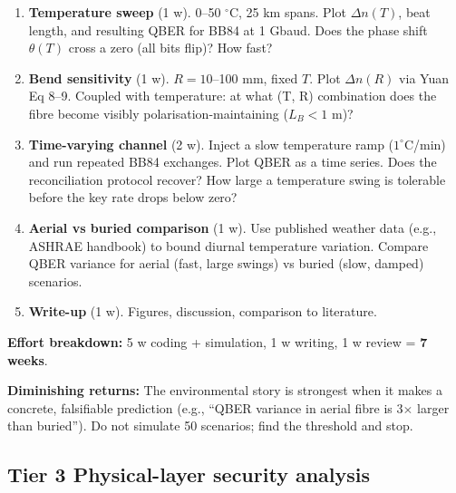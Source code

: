 \documentclass[11pt,a4paper]{article}
\begin{document}
\begin{enumerate}[nosep]
    \item \textbf{Temperature sweep} (1 w).  0--50 $^\circ$C, 25 km spans.  Plot $\Delta n(T)$,
          beat length, and resulting QBER for BB84 at 1 Gbaud.  Does the phase shift $\theta(T)$
          cross a zero (all bits flip)?  How fast?

    \item \textbf{Bend sensitivity} (1 w).  \(R = 10\)--100 mm, fixed $T$.  Plot $\Delta n(R)$
          via Yuan Eq 8--9.  Coupled with temperature: at what (T, R) combination does the
          fibre become visibly polarisation-maintaining ($L_B < 1$ m)?

    \item \textbf{Time-varying channel} (2 w).  Inject a slow temperature ramp
          ($1^\circ$C/min) and run repeated BB84 exchanges.  Plot QBER as a time series.
          Does the reconciliation protocol recover?  How large a temperature swing is tolerable
          before the key rate drops below zero?

    \item \textbf{Aerial vs buried comparison} (1 w).  Use published weather data (e.g., ASHRAE
          handbook) to bound diurnal temperature variation.  Compare QBER variance for aerial
          (fast, large swings) vs buried (slow, damped) scenarios.

    \item \textbf{Write-up} (1 w).  Figures, discussion, comparison to literature.
\end{enumerate}

\vspace{4pt}
\noindent\textbf{Effort breakdown:} 5 w coding + simulation, 1 w writing, 1 w review = \textbf{7 weeks}.

\vspace{4pt}
\noindent\textbf{Diminishing returns:} The environmental story is strongest when it makes a
concrete, falsifiable prediction (e.g., ``QBER variance in aerial fibre is 3$\times$ larger
than buried'').  Do not simulate 50 scenarios; find the threshold and stop.

\newpage

\subsection*{\color{tier3}Tier 3 \hfill Physical-layer security analysis}
\end{document}
